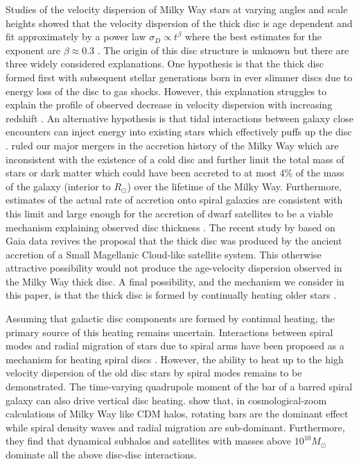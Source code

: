 \documentclass[usenatbib]{mnras}
\begin{document}
Studies of the velocity dispersion of Milky Way stars at varying angles and scale heights showed that the velocity dispersion of the thick disc is age dependent and fit approximately by a power law $\sigma_D \propto t^{\beta}$ where the best estimates for the exponent are $\beta \approx 0.3$ \citep{heating_history}. The origin of this disc structure is unknown but there are three widely considered explanations. One hypothesis is that the thick disc formed first with subsequent stellar generations born in ever slimmer discs due to energy loss of the disc to gas shocks. However, this explanation struggles to explain the profile of observed decrease in velocity dispersion with increasing redshift \citep{emergence-thick-disc}. An alternative hypothesis is that tidal interactions between galaxy close encounters can inject energy into existing stars which effectively puffs up the disc \citep{thick-disc-mergers}. \cite{mergers} ruled our major mergers in the accretion history of the Milky Way which are inconsistent with the existence of a cold disc and further limit the total mass of stars or dark matter which could have been accreted to at most 4\% of the mass of the galaxy (interior to $R_{\odot}$) over the lifetime of the Milky Way. Furthermore, estimates of the actual rate of accretion onto spiral galaxies are consistent with this limit and large enough for the accretion of dwarf satellites to be a viable mechanism explaining observed disc thickness \citep{mergers}.
The recent study by \cite{gaia_normal_process} based on Gaia data revives the proposal that the thick disc was produced by the ancient accretion of a Small Magellanic Cloud-like satellite system. This otherwise attractive possibility would not produce the age-velocity dispersion observed in the Milky Way thick disc. 
A final possibility, and the mechanism we consider in this paper, is that the thick disc is formed by continually heating older stars \citep{thin-and-thick-disc}. 
\par 
Assuming that galactic disc components are formed by continual heating, the primary source of this heating remains uncertain. Interactions between spiral modes and radial migration of stars due to spiral arms have been proposed as a mechanism for heating spiral discs \citep{radial_migration}. However, the ability to heat up to the high velocity dispersion of the old disc stars by spiral modes remains to be demonstrated. The time-varying quadrupole moment of the bar of a barred spiral galaxy can also drive vertical disc heating. \cite{vertical_heating_modes} show that, in cosmological-zoom calculations of Milky Way like CDM halos, rotating bars are the dominant effect while spiral density waves and radial migration are sub-dominant. Furthermore, they find that dynamical subhalos and satellites with masses above $10^{10} M_{\odot}$ dominate all the above disc-disc interactions. 
\end{document}
